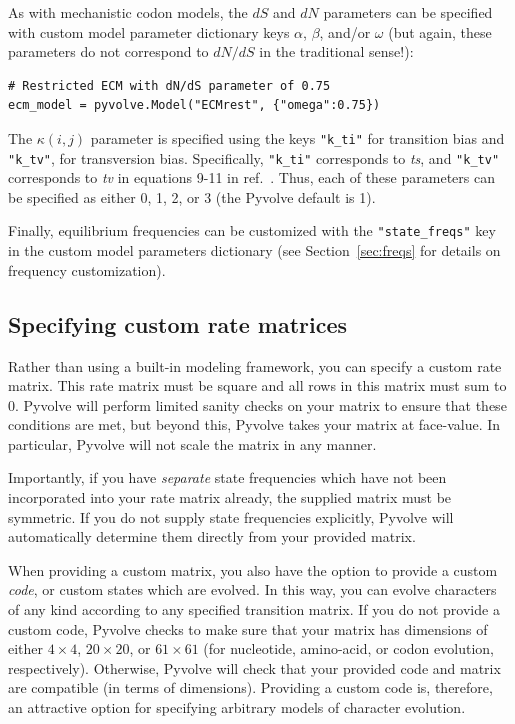 \documentclass{article}
\newcommand{\code}[1]{\texttt{\small{#1}}}
\begin{document}
As with mechanistic codon models, the $dS$ and $dN$ parameters can be specified with custom model parameter dictionary keys $\alpha$, $\beta$, and/or $\omega$ (but again, these parameters do not correspond to $dN/dS$ in the traditional sense!):
\begin{lstlisting}
# Restricted ECM with dN/dS parameter of 0.75
ecm_model = pyvolve.Model("ECMrest", {"omega":0.75})
\end{lstlisting}

The $\kappa(i,j)$ parameter is specified using the keys \code{"k\_ti"} for transition bias and \code{"k\_tv"}, for transversion bias. Specifically, \code{"k\_ti"} corresponds to \emph{ts}, and \code{"k\_tv"} corresponds to \emph{tv} in equations 9-11 in ref.\ \citep{ECM}. Thus, each of these parameters can be specified as either 0, 1, 2, or 3 (the Pyvolve default is 1).


Finally, equilibrium frequencies can be customized with the \code{"state\_freqs"} key in the custom model parameters dictionary (see Section~\ref{sec:freqs} for details on frequency customization). 



\subsection{Specifying custom rate matrices}\label{sec:custom}

Rather than using a built-in modeling framework, you can specify a custom rate matrix. This rate matrix must be square and all rows in this matrix must sum to 0. Pyvolve will perform limited sanity checks on your matrix to ensure that these conditions are met, but beyond this, Pyvolve takes your matrix at face-value. In particular, Pyvolve will not scale the matrix in any manner. 

Importantly, if you have \emph{separate} state frequencies which have not been incorporated into your rate matrix already, the supplied matrix must be symmetric. If you do not supply state frequencies explicitly, Pyvolve will automatically determine them directly from your provided matrix. 

When providing a custom matrix, you also have the option to provide a custom \emph{code}, or custom states which are evolved. In this way, you can evolve characters of any kind according to any specified transition matrix. If you do not provide a custom code, Pyvolve checks to make sure that your matrix has dimensions of either $4\times4$, $20\times20$, or $61\times61$ (for nucleotide, amino-acid, or codon evolution, respectively). Otherwise, Pyvolve will check that your provided code and matrix are compatible (in terms of dimensions). Providing a custom code is, therefore, an attractive option for specifying arbitrary models of character evolution.
\end{document}

